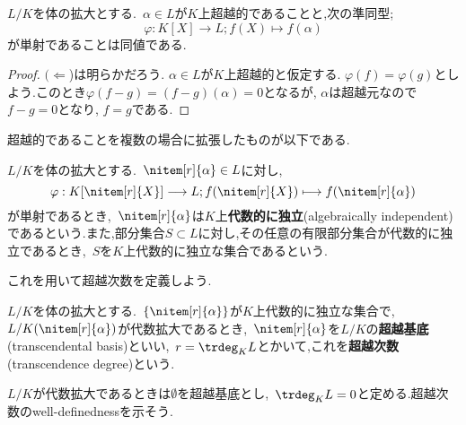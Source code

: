\begin{prop}
	$L/K$を体の拡大とする.~$\alpha\in L$が$K$上超越的であることと,次の準同型;
	\[\varphi:K[X]\longrightarrow L;f(X)\longmapsto f(\alpha)\]
	が単射であることは同値である.
\end{prop}

\begin{proof}
	$(\Longleftarrow$)は明らかだろう. $\alpha\in L$が$K$上超越的と仮定する. $\varphi(f)=\varphi(g)$としよう.このとき$\varphi(f-g)=(f-g)(\alpha)=0$となるが, $\alpha$は超越元なので$f-g=0$となり, $f=g$である.
\end{proof}

超越的であることを複数の場合に拡張したものが以下である.

\begin{defi}[代数的に独立]
	$L/K$を体の拡大とする.~$\nitem[r]{\alpha}\in L$に対し,
	\[\varphi:K[\nitem[r]{X}]\longrightarrow L;f(\nitem[r]{X})\longmapsto f(\nitem[r]{\alpha})\]
	が単射であるとき,~$\nitem[r]{\alpha}$は$K$上\textbf{代数的に独立}(algebraically independent)であるという.また,部分集合$S\subset L$に対し,その任意の有限部分集合が代数的に独立であるとき,~$S$を$K$上代数的に独立な集合であるという.
\end{defi}

これを用いて超越次数を定義しよう.

\begin{defi}[超越基底]
	$L/K$を体の拡大とする.~$\{\nitem[r]{\alpha}\}$が$K$上代数的に独立な集合で,~$L/K(\nitem[r]{\alpha})$が代数拡大であるとき,~$\nitem[r]{\alpha}$を$L/K$の\textbf{超越基底}(transcendental basis)といい,~$r=\trdeg_K L$とかいて,これを\textbf{超越次数}(transcendence degree)という.
\end{defi}

$L/K$が代数拡大であるときは$\emptyset$を超越基底とし,~$\trdeg_K L=0$と定める.超越次数のwell-definednessを示そう.

